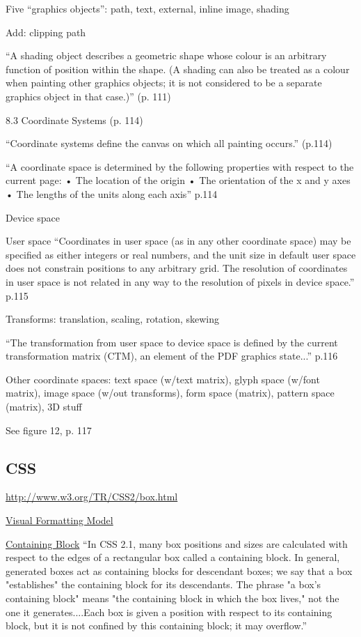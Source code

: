 \documentclass[reqno,12pt]{tufte-handout}
\numberwithin{equation}{subsection}
\numberwithin{equation}{subsection}
\begin{document}
\begin{appendices}
Five ``graphics objects'': path, text, external, inline image, shading

Add: clipping path

``A shading object describes a geometric shape whose colour is an arbitrary function of position within the shape. (A shading can also be treated as a colour when painting other graphics objects; it is not considered to be a separate graphics object in that case.)'' (p. 111)


8.3 Coordinate Systems (p. 114)

``Coordinate systems define the canvas on which all painting occurs.'' (p.114)

``A coordinate space is determined by the following properties with respect to the current page:
• The location of the origin
• The orientation of the x and y axes
• The lengths of the units along each axis'' p.114

Device space

User space
``Coordinates in user space (as in any other coordinate space) may be specified as either integers or real numbers, and the unit size in default user space does not constrain positions to any arbitrary grid. The resolution of coordinates in user space is not related in any way to the resolution of pixels in device space.'' p.115

Transforms: translation, scaling, rotation, skewing


``The transformation from user space to device space is defined by the current transformation matrix (CTM), an element of the PDF graphics state...'' p.116

Other coordinate spaces: text space (w/text matrix), glyph space
(w/font matrix), image space (w/out transforms), form space (matrix),
pattern space (matrix), 3D stuff

See figure 12, p. 117

\subsection{CSS}

\url{http://www.w3.org/TR/CSS2/box.html}

\href{http://www.w3.org/TR/CSS2/visuren.html}{Visual Formatting Model}

\href{http://www.w3.org/TR/CSS2/visuren.html#containing-block}{Containing
  Block} ``In CSS 2.1, many box positions and sizes are calculated
with respect to the edges of a rectangular box called a containing
block. In general, generated boxes act as containing blocks for
descendant boxes; we say that a box "establishes" the containing block
for its descendants. The phrase "a box's containing block" means "the
containing block in which the box lives," not the one it
generates....Each box is given a position with respect to its
containing block, but it is not confined by this containing block; it
may overflow.''


\end{appendices}
\end{document}
